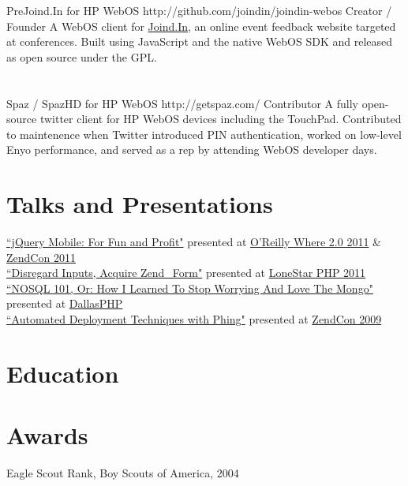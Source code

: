 \documentclass{resume}
\begin{document}
\project
	{PreJoind.In for HP WebOS}
	{http://github.com/joindin/joindin-webos}
	{Creator / Founder}
	{A WebOS client for \href{http://joind.in/}{Joind.In}, an online event feedback website targeted at conferences. Built using JavaScript and the native WebOS SDK and released as open source under the GPL.}
\\ \\ \\
\project
	{Spaz / SpazHD for HP WebOS}
	{http://getspaz.com/}
	{Contributor}
	{A fully open-source twitter client for HP WebOS devices including the TouchPad. Contributed to maintenence when Twitter introduced PIN authentication, worked on low-level Enyo performance, and served as a rep by attending WebOS developer days.}

\section{Talks and Presentations}

\href{http://www.slideshare.net/eljefe/jquery-mobile-for-fun-and-profit}{``jQuery Mobile: For Fun and Profit"} presented at \href{http://whereconf.com/where2011/public/schedule/speaker/110352}{O'Reilly Where 2.0 2011} \& \href{http://zendcon.com/2011/speaker/#4054}{ZendCon 2011}
\\
\href{http://www.slideshare.net/eljefe/disregard-inputs-acquire-zendform}{``Disregard Inputs, Acquire Zend\_Form"} presented at \href{http://lonestarphp.com/}{LoneStar PHP 2011}
\\
\href{http://www.slideshare.net/eljefe/automated-deployment-with-phing}{``NOSQL 101, Or: How I Learned To Stop Worrying And Love The Mongo"} presented at \href{http://http://dallasphp.org/}{DallasPHP}
\\
\href{http://www.slideshare.net/eljefe/automated-deployment-with-phing}{``Automated Deployment Techniques with Phing"} presented at \href{http://zendcon.com/2009/speakers#4054}{ZendCon 2009}

\section{Education}


\section{Awards}

Eagle Scout Rank, Boy Scouts of America, 2004
\end{document}
